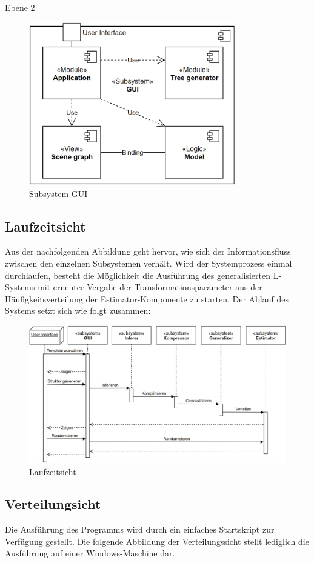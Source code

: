 \underline{Ebene 2}
\begin{figure}[H]
    \centering
    \includegraphics[width=9cm]{../images/Bausteinsicht_Ebene_2.PNG}
    \caption{Subsystem GUI}
\end{figure}

\subsection*{Laufzeitsicht}
Aus der nachfolgenden Abbildung geht hervor, wie sich der Informationsfluss zwischen den einzelnen Subsystemen verhält.
Wird der Systemprozess einmal durchlaufen, besteht die Möglichkeit die Ausführung des generalisierten L-Systems mit
erneuter Vergabe der Transformationsparameter aus der Häufigkeitsverteilung der Estimator-Komponente zu starten.
Der Ablauf des Systems setzt sich wie folgt zusammen:

\begin{figure}[H]
    \centering
    \includegraphics[width=14cm]{../images/Laufzeitsicht.PNG}
    \caption{Laufzeitsicht}
\end{figure}

\subsection*{Verteilungsicht}
Die Ausführung des Programms wird durch ein einfaches Startskript zur Verfügung gestellt.
Die folgende Abbildung der Verteilungssicht stellt lediglich die Ausführung auf einer Windows-Maschine dar.


